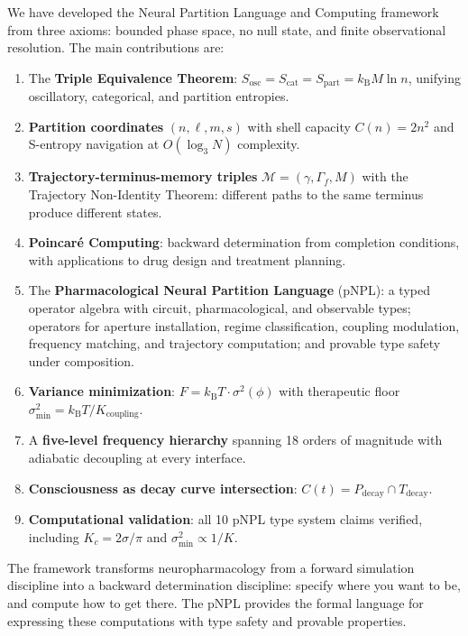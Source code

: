 \documentclass[10pt,twocolumn]{article}
\theoremstyle{remark}
\newcommand{\Gstate}{\Gamma}
\newcommand{\kB}{k_{\mathrm{B}}}
\newcommand{\Pdecay}{P_{\mathrm{decay}}}
\newcommand{\Tdecay}{T_{\mathrm{decay}}}
\newcommand{\Mstate}{\mathcal{M}}
\newcommand{\Sosc}{S_{\mathrm{osc}}}
\newcommand{\Scat}{S_{\mathrm{cat}}}
\newcommand{\Spart}{S_{\mathrm{part}}}
\begin{document}
We have developed the Neural Partition Language and Computing framework from three axioms: bounded phase space, no null state, and finite observational resolution. The main contributions are:

\begin{enumerate}[noitemsep]
\item The \textbf{Triple Equivalence Theorem}: $\Sosc = \Scat = \Spart = \kB M \ln n$, unifying oscillatory, categorical, and partition entropies.

\item \textbf{Partition coordinates} $(n, \ell, m, s)$ with shell capacity $C(n) = 2n^2$ and S-entropy navigation at $O(\log_3 N)$ complexity.

\item \textbf{Trajectory-terminus-memory triples} $\Mstate = (\gamma, \Gstate_f, M)$ with the Trajectory Non-Identity Theorem: different paths to the same terminus produce different states.

\item \textbf{Poincar\'{e} Computing}: backward determination from completion conditions, with applications to drug design and treatment planning.

\item The \textbf{Pharmacological Neural Partition Language} (pNPL): a typed operator algebra with circuit, pharmacological, and observable types; operators for aperture installation, regime classification, coupling modulation, frequency matching, and trajectory computation; and provable type safety under composition.

\item \textbf{Variance minimization}: $F = \kB T \cdot \sigma^2(\phi)$ with therapeutic floor $\sigma^2_{\min} = \kB T / K_{\mathrm{coupling}}$.

\item A \textbf{five-level frequency hierarchy} spanning 18 orders of magnitude with adiabatic decoupling at every interface.

\item \textbf{Consciousness as decay curve intersection}: $C(t) = \Pdecay \cap \Tdecay$.

\item \textbf{Computational validation}: all 10 pNPL type system claims verified, including $K_c = 2\sigma/\pi$ and $\sigma^2_{\min} \propto 1/K$.
\end{enumerate}

The framework transforms neuropharmacology from a forward simulation discipline into a backward determination discipline: specify where you want to be, and compute how to get there. The pNPL provides the formal language for expressing these computations with type safety and provable properties.



\end{document}

